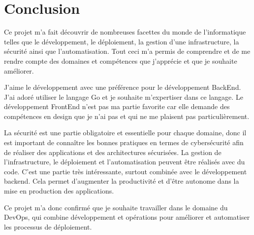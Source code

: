 \section{Conclusion}

Ce projet m’a fait découvrir de nombreuses facettes du monde de l’informatique telles que le développement, le déploiement, la gestion d’une infrastructure, la sécurité ainsi que l’automatisation.
Tout ceci m’a permis de comprendre et de me rendre compte des domaines et compétences que j’apprécie et que je souhaite améliorer.

J’aime le développement avec une préférence pour le développement BackEnd.
J’ai adoré utiliser le langage Go et je souhaite m’expertiser dans ce langage.
Le développement FrontEnd n’est pas ma partie favorite car elle demande des compétences en design que je n’ai pas et qui ne me plaisent pas particulièrement.

La sécurité est une partie obligatoire et essentielle pour chaque domaine, donc il est important de connaître les bonnes pratiques en termes de cybersécurité afin de réaliser des applications et des architectures sécurisées.
La gestion de l'infrastructure, le déploiement et l'automatisation peuvent être réalisés avec du code.
C'est une partie très intéressante, surtout combinée avec le développement backend.
Cela permet d'augmenter la productivité et d'être autonome dans la mise en production des applications.

Ce projet m'a donc confirmé que je souhaite travailler dans le domaine du DevOps, qui combine développement et opérations pour améliorer et automatiser les processus de déploiement.

\clearpage
